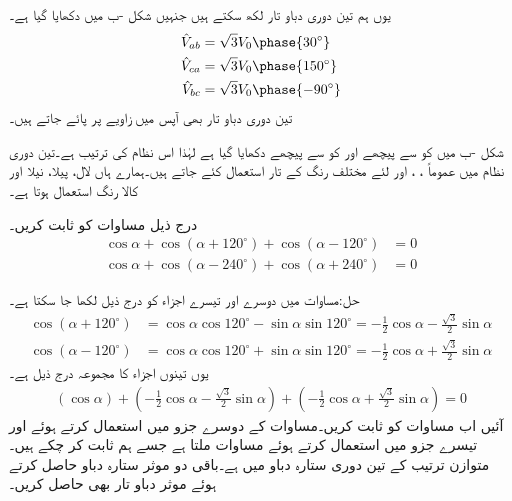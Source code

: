 یوں ہم تین دوری دباو تار لکھ سکتے ہیں جنہیں شکل -ب میں دکھایا گیا ہے۔
\begin{gather}
\begin{aligned}
\hat{V}_{ab}&=\sqrt{3}V_0\phase{30^{\circ}}\\
\hat{V}_{ca}&=\sqrt{3}V_0\phase{150^{\circ}}\\
\hat{V}_{bc}&=\sqrt{3}V_0\phase{-90^{\circ}}
\end{aligned}
\end{gather}
تین دوری دباو تار بھی آپس میں  زاویے پر پائے جاتے ہیں۔

شکل -ب میں   کو  سے  پیچھے اور  کو  سے   پیچھے دکھایا گیا ہے لہٰذا اس نظام کی ترتیب  ہے۔تین دوری نظام میں عموماً ، ،  اور   لئے مختلف رنگ کے تار استعمال کئے جاتے ہیں۔ہمارے ہاں لال، پیلا، نیلا اور کالا رنگ استعمال ہوتا ہے۔

درج ذیل مساوات کو ثابت کریں۔
\begin{align}
\cos \alpha+\cos(\alpha+120^{\circ})+\cos(\alpha-120^{\circ})&=0\label{مساوات_تین_دوری_تکونی_صفر_برابر_ہے}\\
\cos \alpha+\cos(\alpha-240^{\circ})+\cos(\alpha+240^{\circ})&=0\label{مساوات_تین_دوری_تکونی_صفر_برابر_ب}
\end{align}

حل:مساوات  میں دوسرے اور تیسرے اجزاء کو درج ذیل لکھا جا سکتا ہے۔
\begin{align*}
\cos(\alpha+120^{\circ})&=\cos \alpha \cos 120^{\circ}-\sin \alpha \sin 120^{\circ}=-\frac{1}{2}\cos \alpha-\frac{\sqrt{3}}{2}\sin\alpha\\
\cos(\alpha-120^{\circ})&=\cos \alpha \cos 120^{\circ}+\sin \alpha \sin 120^{\circ}=-\frac{1}{2}\cos \alpha+\frac{\sqrt{3}}{2}\sin\alpha
\end{align*}
یوں تینوں اجزاء کا مجموعہ درج ذیل ہے۔
\begin{align*}
(\cos \alpha)+(-\frac{1}{2}\cos \alpha-\frac{\sqrt{3}}{2}\sin\alpha)+(-\frac{1}{2}\cos \alpha+\frac{\sqrt{3}}{2}\sin\alpha)=0
\end{align*}
آئیں اب مساوات  کو ثابت کریں۔مساوات کے دوسرے جزو میں  استعمال کرتے ہوئے اور تیسرے جزو میں  استعمال کرتے ہوئے مساوات  ملتا ہے جسے ہم ثابت کر چکے ہیں۔
متوازن  ترتیب کے تین دوری ستارہ دباو  میں  ہے۔باقی دو موثر ستارہ دباو حاصل کرتے ہوئے موثر دباو تار بھی حاصل کریں۔

